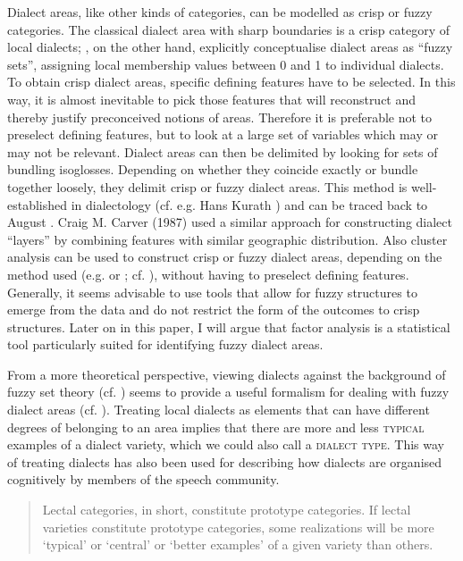 \documentclass[output=paper]{LSP/langsci}
\begin{document}
Dialect areas, like other kinds of categories, can be modelled as crisp or fuzzy categories. The classical dialect area with sharp boundaries is a crisp category of local dialects; \citet[108--113]{preston_applications_1993}, on the other hand, explicitly conceptualise dialect areas as “fuzzy sets”, assigning local membership values between 0 and 1 to individual dialects. To obtain crisp dialect areas, specific defining features have to be selected. In this way, it is almost inevitable to pick those features that will reconstruct and thereby justify preconceived notions of areas. Therefore it is preferable not to preselect defining features, but to look at a large set of variables which may or may not be relevant. Dialect areas can then be delimited by looking for sets of bundling isoglosses. Depending on whether they coincide exactly or bundle together loosely, they delimit crisp or fuzzy dialect areas. This method is well-established in dialectology (cf. e.g. Hans Kurath \citeyear{kurath_studies_1972}) and can be traced back to August \citet{bielenstein_grenzen_1892}. Craig M. Carver (1987) %
used a similar approach for constructing dialect ``layers''  by combining features with similar geographic distribution. Also cluster analysis can be used to construct crisp or fuzzy dialect areas, depending on the method used (e.g.  or ; cf. \citealt[83]{nerbonne_gabmap_2011}), without having to preselect defining features. Generally, it seems advisable to use tools that allow for fuzzy structures to emerge from the data and do not restrict the form of the outcomes to crisp structures. Later on in this paper, I will argue that factor analysis is a statistical tool particularly suited for identifying fuzzy dialect areas.

From a more theoretical perspective, viewing dialects against the background of fuzzy set theory (cf. \citealt{zadeh_fuzzy_1965}) seems to provide a useful formalism for dealing with fuzzy dialect areas (cf. \citealt{preston_applications_1993}). Treating local dialects as elements that can have different degrees of belonging to an area implies that there are more and less \textsc{typical} examples of a dialect variety, which we could also call a \textsc{dialect type}. This way of treating dialects has also been used for describing how dialects are organised cognitively by members of the speech community.

\begin{quote}
Lectal categories, in short, constitute prototype categories. If lectal varieties constitute prototype categories, some realizations will be more ‘typical’ or ‘central’ or ‘better examples’ of a given variety than others. \citep[59]{kristiansen_style-shifting_2008}
\end{quote}
\end{document}
